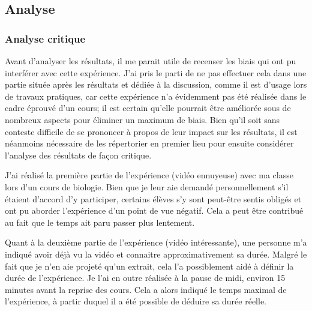 \documentclass[12pt,fleqn,oneside,openany]{book} %
\begin{document}
\subsection{Analyse} \label{ssec:analyse1.1}

\subsubsection{Analyse critique} \label{sssec:analyseCrit1.1}
Avant d'analyser les résultats, il me parait utile de recenser les biais qui ont pu interférer avec cette expérience. J'ai pris le parti de ne pas effectuer cela dans une partie située après les résultats et dédiée à la discussion, comme il est d'usage lors de travaux pratiques, car cette expérience n'a évidemment pas été réalisée dans le cadre éprouvé d'un cours; il est certain qu'elle pourrait être améliorée sous de nombreux aspects pour éliminer un maximum de biais. Bien qu'il soit sans conteste difficile de se prononcer à propos de leur impact sur les résultats, il est néanmoins nécessaire de les répertorier en premier lieu pour ensuite considérer l'analyse des résultats de façon critique.

J'ai réalisé la première partie de l'expérience (vidéo ennuyeuse) avec ma classe lors d'un cours de biologie. Bien que je leur aie demandé personnellement s'il étaient d'accord d'y participer, certains élèves s'y sont peut-être sentis obligés et ont pu aborder l'expérience d'un point de vue négatif. Cela a peut être contribué au fait que le temps ait paru passer plus lentement.

Quant à la deuxième partie de l'expérience (vidéo intéressante), une personne m'a indiqué avoir déjà vu la vidéo et connaitre approximativement sa durée. Malgré le fait que je n'en aie projeté qu'un extrait, cela l'a possiblement aidé à définir la durée de l'expérience.
Je l'ai en outre réalisée à la pause de midi, environ 15 minutes avant la reprise des cours. Cela a alors indiqué le temps maximal de l'expérience, à partir duquel il a été possible de déduire sa durée réelle. 
\end{document}

